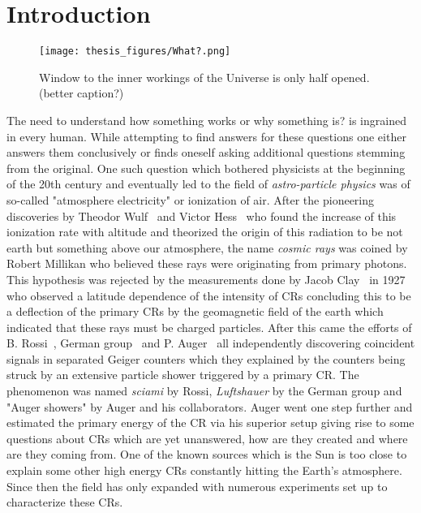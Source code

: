 
\chapter{Introduction}
\label{sec:intro}
\begin{figure}[h!]
\centering
  \texttt{[image: thesis\_figures/What?.png]}
\caption{Window to the inner workings of the Universe is only half opened. (better caption?)}
\label{fig:intro}
\end{figure}
The need to understand how something works or why something is? is ingrained in every human. While attempting to find answers for these questions one either answers them conclusively or finds oneself asking additional questions stemming from the original. One such question which bothered physicists at the beginning of the 20th century and eventually led to the field of \textit{astro-particle physics} was of so-called "atmosphere electricity" or ionization of air. After the pioneering discoveries by Theodor Wulf~\cite{article_Wulf} and Victor Hess~\cite{Hess:1912srp} who found the increase of this ionization rate with altitude and theorized the origin of this radiation to be not earth but something above our atmosphere, the name \textit{cosmic rays} was coined by Robert Millikan who believed these rays were originating from primary photons. This hypothesis was rejected by the measurements done by Jacob Clay~\cite{Clay:1927I,Clay:1928II} in 1927 who observed a latitude dependence of the intensity of \glspl{CR} concluding this to be a deflection of the primary \glspl{CR} by the geomagnetic field of the earth which indicated that these rays must be charged particles. After this came the efforts of B. Rossi~\cite{rossi1933eigenschaften}, German group~\cite{schmeiser1938harten} and P. Auger~\cite{RevModPhys.11.288} all independently discovering coincident signals in separated Geiger counters which they explained by the counters being struck by an extensive particle shower triggered by a primary \gls{CR}. The phenomenon was named \textit{sciami} by Rossi, \textit{Luftshauer} by the German group and "Auger showers" by Auger and his collaborators. Auger went one step further and estimated the primary energy of the \gls{CR} via his superior setup giving rise to some questions about \glspl{CR} which are yet unanswered, how are they created and where are they coming from. One of the known sources which is the Sun is too close to explain some other high energy \glspl{CR} constantly hitting the Earth's atmosphere. Since then the field has only expanded with numerous experiments set up to characterize these \glspl{CR}. 


